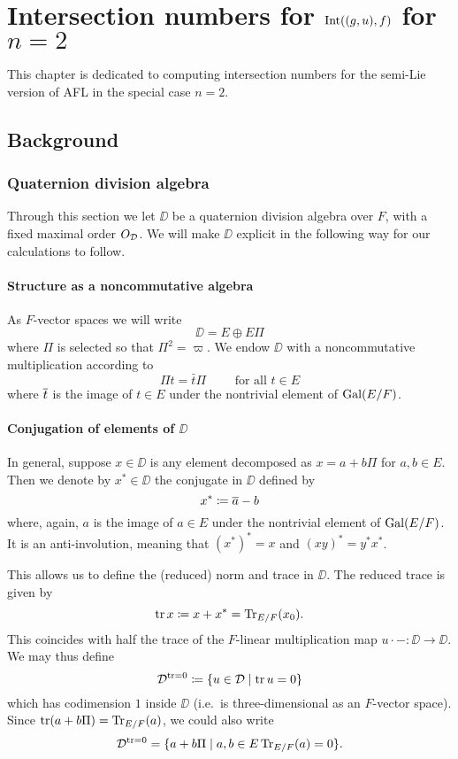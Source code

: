\chapter{Intersection numbers for $\operatorname{Int}((g,u), f)$ for $n = 2$}
This chapter is dedicated to computing intersection numbers
for the semi-Lie version of AFL in the special case $n = 2$.

\section{Background}
\subsection{Quaternion division algebra}
Through this section we let $\DD$ be a quaternion division algebra over $F$,
with a fixed maximal order $O_\mathcal D$.
We will make $\DD$ explicit in the following way for our calculations to follow.

\subsubsection{Structure as a noncommutative algebra}
As $F$-vector spaces we will write
\[ \DD = E \oplus E \Pi \]
where $\Pi$ is selected so that $\Pi^2 = \varpi$.
We endow $\DD$ with a noncommutative multiplication according to
\[ \Pi t = \bar t \Pi \qquad \text{ for all } t \in E \]
where $\overline{t}$ is the image of $t \in E$ under the nontrivial element of $\operatorname{Gal}(E/F)$.

\subsubsection{Conjugation of elements of $\DD$}
In general, suppose $x \in \DD$ is any element
decomposed as $x = a + b \Pi$ for $a,b \in E$.
Then we denote by $x^\ast \in \DD$ the conjugate in $\DD$ defined by
\[ x^\ast \coloneqq \overline{a} - b \]
where, again, $a$ is the image of $a \in E$ under the nontrivial element of $\operatorname{Gal}(E/F)$.
It is an anti-involution, meaning that $(x^\ast)^\ast = x$ and $(xy)^\ast = y^\ast x^\ast$.

This allows us to define the (reduced) norm and trace in $\DD$.
The reduced trace is given by
\[ \operatorname{tr} x \coloneqq x + x^\ast = \operatorname{Tr}_{E/F}(x_0). \]
This coincides with half the trace of the
$F$-linear multiplication map $u \cdot - \colon \DD \to \DD$.
We may thus define
\[ \mathcal D^{\operatorname{tr} = 0} \coloneqq \left\{ u \in \mathcal D \mid \operatorname{tr} u = 0 \right\} \]
which has codimension $1$ inside $\DD$ (i.e.\ is three-dimensional as an $F$-vector space).
Since $\operatorname{tr}(a+b\Pi) = \operatorname{Tr}_{E/F}(a)$,
we could also write
\[ \mathcal D^{\operatorname{tr} = 0} = \{ a+b\Pi \mid a,b \in E \operatorname{Tr}_{E/F}(a) = 0 \}. \]


